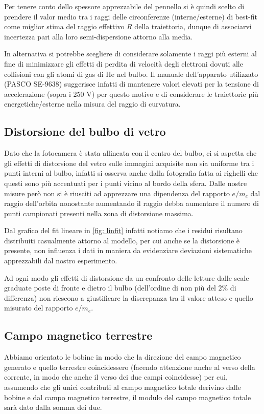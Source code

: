 \documentclass[10pt, a4paper, italian]{article}
\begin{document}
Per tenere conto dello spessore apprezzabile del pennello si è quindi scelto
di prendere il valor medio tra i raggi delle circonferenze (interne/esterne) di
best-fit come miglior stima del raggio effettivo $R$ della traiettoria, dunque
di associarvi incertezza pari alla loro semi-dispersione attorno alla media.

In alternativa si potrebbe scegliere di considerare solamente i raggi più
esterni al fine di minimizzare gli effetti di perdita di velocità degli
elettroni dovuti alle collisioni con gli atomi di gas di He nel bulbo.
Il manuale dell'apparato utilizzato (PASCO SE-9638) suggerisce infatti di
mantenere valori elevati per la tensione di accelerazione (sopra i 250 V)
per questo motivo e di considerare le traiettorie più energetiche/esterne
nella misura del raggio di curvatura.

\subsection{Distorsione del bulbo di vetro}
Dato che la fotocamera è stata allineata con il centro del bulbo, ci si
aspetta che gli effetti di distorsione del vetro sulle immagini acquisite
non sia uniforme tra i punti interni al bulbo, infatti si osserva anche
dalla fotografia fatta ai righelli che questi sono più accentuati per i punti
vicino al bordo della sfera. Dalle nostre misure però non si è riusciti ad
apprezzare una dipendenza del rapporto $e/m_e$ dal raggio dell'orbita
nonostante aumentando il raggio debba aumentare il numero di punti campionati
presenti nella zona di distorsione massima.
 
Dal grafico del fit lineare in \cref{fig: linfit} infatti notiamo che i
residui risultano distribuiti casualmente attorno al modello, per cui anche se
la distorsione è presente, non influenza i dati in maniera da evidenziare
deviazioni sistematiche apprezzabili dal nostro esperimento.

Ad ogni modo gli effetti di distorsione da un confronto delle letture dalle
scale graduate poste di fronte e dietro il bulbo (dell'ordine di non più del
$2\%$ di differenza) non riescono a giustificare la discrepanza tra il valore
atteso e quello misurato del rapporto $e/m_e$.

\subsection{Campo magnetico terrestre}
Abbiamo orientato le bobine in modo che la direzione del campo magnetico
generato e quello terrestre coincidessero (facendo attenzione anche al verso
della corrente, in modo che anche il verso dei due campi coincidesse) per 
cui, assumendo che gli unici contributi al campo magnetico totale derivino
dalle bobine e dal campo magnetico terrestre, il modulo del campo magnetico
totale sarà dato dalla somma dei due.
\end{document}
